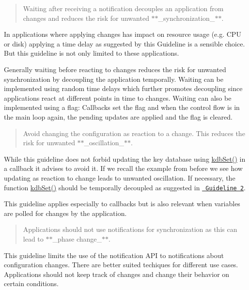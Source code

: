 \begin{quote}
Waiting after receiving a notification decouples an application from changes and reduces the risk for unwanted $\ast$$\ast$\+\_\+synchronization\+\_\+$\ast$$\ast$. \end{quote}


In applications where applying changes has impact on resource usage (e.\+g. C\+PU or disk) applying a time delay as suggested by this Guideline is a sensible choice. But this guideline is not only limited to these applications.

Generally waiting before reacting to changes reduces the risk for unwanted synchronization by decoupling the application temporally. Waiting can be implemented using random time delays which further promotes decoupling since applications react at different points in time to changes. Waiting can also be implemented using a flag\+: Callbacks set the flag and when the control flow is in the main loop again, the pending updates are applied and the flag is cleared.

\begin{quote}
Avoid changing the configuration as reaction to a change. This reduces the risk for unwanted $\ast$$\ast$\+\_\+oscillation\+\_\+$\ast$$\ast$. \end{quote}


While this guideline does not forbid updating the key database using {\ttfamily \mbox{\hyperlink{group__kdb_ga11436b058408f83d303ca5e996832bcf}{kdb\+Set()}}} in a callback it advises to avoid it. If we recall the example from before we see how updating as reaction to change leads to unwanted oscillation. If necessary, the function {\ttfamily \mbox{\hyperlink{group__kdb_ga11436b058408f83d303ca5e996832bcf}{kdb\+Set()}}} should be temporally decoupled as suggested in \href{\#guideline-2-wait-before-reacting-to-changes}{\texttt{ Guideline 2}}.

This guideline applies especially to callbacks but is also relevant when variables are polled for changes by the application.

\begin{quote}
Applications should not use notifications for synchronization as this can lead to $\ast$$\ast$\+\_\+phase change\+\_\+$\ast$$\ast$. \end{quote}


This guideline limits the use of the notification A\+PI to notifications about configuration changes. There are better suited techiques for different use cases. Applications should not keep track of changes and change their behavior on certain conditions.

